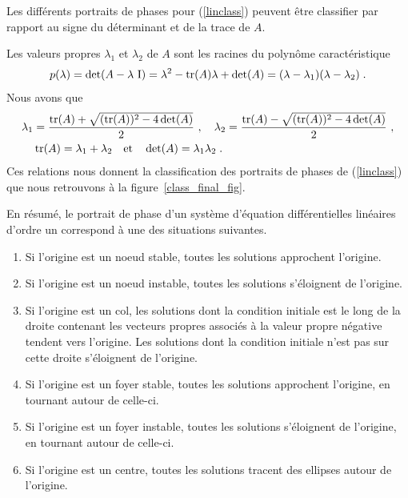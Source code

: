 {Les différents portraits de phases pour (\ref{linclass}) peuvent être
classifier par rapport au signe du déterminant et de la trace de
$A$.

Les valeurs propres $\lambda_1$ et $\lambda_2$ de $A$ sont les racines du
polynôme caractéristique
\[
p(\lambda) = \det(A-\lambda\,\operatorname{I})
= \lambda^2 - \operatorname{tr}(A) \lambda + \det(A)
= (\lambda - \lambda_1)(\lambda - \lambda_2) \; .
\]
Nous avons que
\begin{align*}
\lambda_1 &= \frac{\operatorname{tr}(A) + \sqrt{ (\operatorname{tr}(A))^2 - 4 \det(A) }}{2} \ , \quad
\lambda_2 = \frac{\operatorname{tr}(A) - \sqrt{ (\operatorname{tr}(A))^2 - 4 \det(A) }}{2} \ ,\\
&\operatorname{tr}(A) = \lambda_1+\lambda_2 \quad \text{et} \quad
\det(A) = \lambda_1\lambda_2 \; .
\end{align*}
Ces relations nous donnent la classification des portraits de
phases de (\ref{linclass}) que nous retrouvons à la
figure~\ref{class_final_fig}.


En résumé, le portrait de phase d'un système d'équation
différentielles linéaires d'ordre un correspond à une des situations
suivantes.
\begin{enumerate}
\item Si l'origine est un noeud stable, toutes les solutions
  approchent l'origine.
\item Si l'origine est un noeud instable, toutes les solutions
  s'éloignent de l'origine.
\item Si l'origine est un col, les solutions dont la condition initiale
  est le long de la droite contenant les vecteurs propres associés à
  la valeur propre négative tendent vers l'origine.  Les solutions
  dont la condition initiale n'est pas sur cette droite s'éloignent de
  l'origine.
\item Si l'origine est un foyer stable, toutes les solutions
  approchent l'origine, en tournant autour de celle-ci. 
\item Si l'origine est un foyer instable, toutes les solutions
  s'éloignent de l'origine, en tournant autour de celle-ci.
\item Si l'origine est un centre, toutes les solutions tracent des
  ellipses autour de l'origine. 
\end{enumerate}

}
